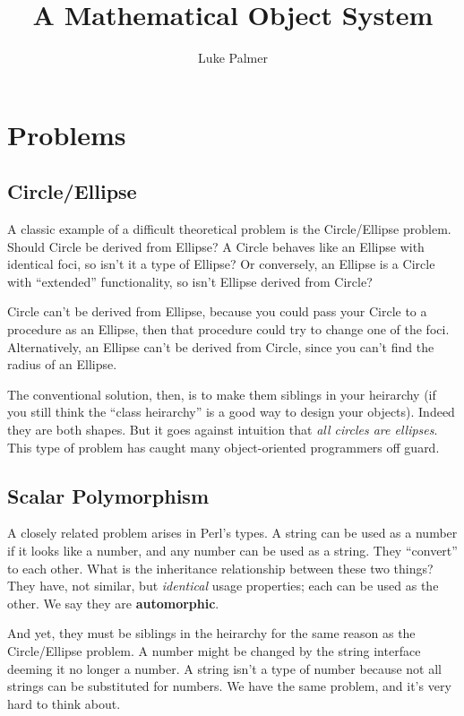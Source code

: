 \documentclass[12pt]{article}
\title{A Mathematical Object System}
\author{Luke Palmer}
\begin{document}
\maketitle

\tableofcontents

\section{Problems}
\label{problems}
\subsection{Circle/Ellipse}

A classic example of a difficult theoretical problem is the
Circle/Ellipse problem.  Should Circle be derived from Ellipse?  A
Circle behaves like an Ellipse with identical foci, so isn't it a type
of Ellipse?  Or conversely, an Ellipse is a Circle with ``extended''
functionality, so isn't Ellipse derived from Circle?

Circle can't be derived from Ellipse, because you could pass your Circle
to a procedure as an Ellipse, then that procedure could try to change
one of the foci.  Alternatively, an Ellipse can't be derived from
Circle, since you can't find the radius of an Ellipse.

The conventional solution, then, is to make them siblings in your
heirarchy (if you still think the ``class heirarchy'' is a good way to
design your objects).  Indeed they are both shapes.  But it goes against
intuition that \textit{all circles are ellipses}.  This type of problem
has caught many object-oriented programmers off guard.

\subsection{Scalar Polymorphism}

A closely related problem arises in Perl's types.  A string can be used
as a number if it looks like a number, and any number can be used as a
string.  They ``convert'' to each other.  What is the inheritance
relationship between these two things?  They have, not similar, but
\textit{identical} usage properties; each can be used as the other.  We
say they are \textbf{automorphic}.

And yet, they must be siblings in the heirarchy for the same reason as
the Circle/Ellipse problem.  A number might be changed by the string
interface deeming it no longer a number.  A string isn't a type of
number because not all strings can be substituted for numbers.  We have
the same problem, and it's very hard to think about.
\end{document}

